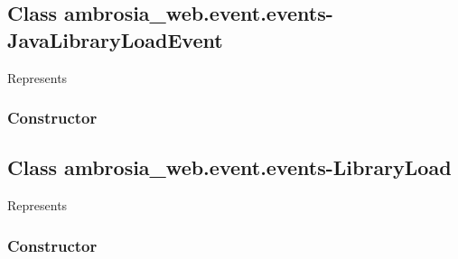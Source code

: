 \documentclass[letterpaper,10pt,english]{sphinxmanual}
\begin{document}
\begin{fulllineitems}
\label{ambrosia_web.event.events-FileEvent:ambrosia_web.event.events-FileEvent}
\end{fulllineitems}



\subsection{Class ambrosia\_web.event.events-JavaLibraryLoadEvent}
\label{ambrosia_web.event.events-JavaLibraryLoadEvent::doc}\label{ambrosia_web.event.events-JavaLibraryLoadEvent:class-ambrosia-web-event-events-javalibraryloadevent}
Represents {\hyperref[ambrosia_plugins.lkm:ambrosia_plugins.lkm.events.JavaLibraryLoadEvent]{}}


\subsubsection{Constructor}
\label{ambrosia_web.event.events-JavaLibraryLoadEvent:constructor}

\begin{fulllineitems}
\label{ambrosia_web.event.events-JavaLibraryLoadEvent:ambrosia_web.event.events-JavaLibraryLoadEvent}
\end{fulllineitems}



\subsection{Class ambrosia\_web.event.events-LibraryLoad}
\label{ambrosia_web.event.events-LibraryLoad:class-ambrosia-web-event-events-libraryload}\label{ambrosia_web.event.events-LibraryLoad::doc}
Represents 


\subsubsection{Constructor}
\label{ambrosia_web.event.events-LibraryLoad:constructor}

\begin{fulllineitems}
\label{ambrosia_web.event.events-LibraryLoad:ambrosia_web.event.events-LibraryLoad}
\end{fulllineitems}
\end{document}
